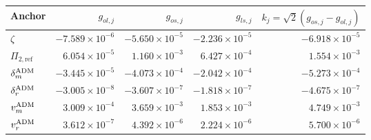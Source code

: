 \begin{tabular}{lrrrr}
\toprule
Anchor & $g_{ol,j}$ & $g_{os,j}$ & $g_{ls,j}$ & $k_j=\sqrt2(g_{os,j}-g_{ol,j})$\\
\midrule
$\zeta$ & $-7.589\times10^{-6}$ & $-5.650\times10^{-5}$ & $-2.236\times10^{-5}$ & $-6.918\times10^{-5}$\\
$\Pi_{2,\mathrm{ref}}$ & $6.054\times10^{-5}$ & $1.160\times10^{-3}$ & $6.427\times10^{-4}$ & $1.554\times10^{-3}$\\
$\delta_m^{\rm ADM}$ & $-3.445\times10^{-5}$ & $-4.073\times10^{-4}$ & $-2.042\times10^{-4}$ & $-5.273\times10^{-4}$\\
$\delta_r^{\rm ADM}$ & $-3.005\times10^{-8}$ & $-3.607\times10^{-7}$ & $-1.818\times10^{-7}$ & $-4.675\times10^{-7}$\\
$v_m^{\rm ADM}$ & $3.009\times10^{-4}$ & $3.659\times10^{-3}$ & $1.853\times10^{-3}$ & $4.749\times10^{-3}$\\
$v_r^{\rm ADM}$ & $3.612\times10^{-7}$ & $4.392\times10^{-6}$ & $2.224\times10^{-6}$ & $5.700\times10^{-6}$\\
\bottomrule
\end{tabular}
